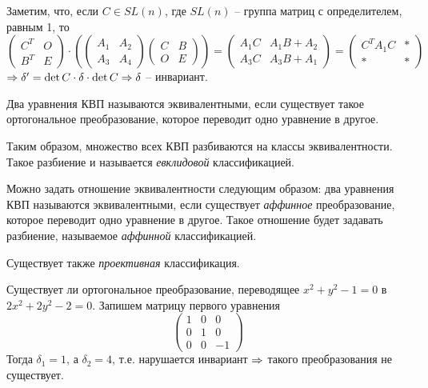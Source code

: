\begin{Rem}
	Заметим, что, если $C \in SL(n)$, где $SL(n)$ -- группа матриц с определителем, равным 1, то
	\[\left(\begin{array}{cc}
	C^T & O \\ 
	B^T & E
	\end{array}\right) \cdot \left(\left(\begin{array}{cc}
	A_1 & A_2 \\ 
	A_3 & A_4
	\end{array}\right) \left(\begin{array}{c|c}
	C & B \\ 
	\hline
	O & E
	\end{array}\right)\right) = \left(\begin{array}{cc}
	A_1 C & A_1 B + A_2 \\ 
	A_3 C & A_3 B + A_1
	\end{array}\right) = \left(\begin{array}{c|c}
	C^T A_1 C & * \\ 
	\hline
	* & *
	\end{array}\right)\]
	$\Rightarrow \delta' = \det C \cdot \delta \cdot \det C \Rightarrow \delta$ -- инвариант.
\end{Rem}


\begin{Def}
	Два уравнения КВП называются эквивалентными, если существует такое ортогональное преобразование, которое переводит одно уравнение в другое.
\end{Def}

\begin{Rem}
	Таким образом, множество всех КВП разбиваются на классы эквивалентности.
	Такое разбиение и называется \textit{евклидовой} классификацией.
\end{Rem}

\begin{Rem}
	Можно задать отношение эквивалентности следующим образом: два уравнения КВП называются эквивалентными, если существует \textit{аффинное} преобразование, которое переводит одно уравнение в другое.
	Такое отношение будет задавать разбиение, называемое \textit{аффинной} классификацией.
\end{Rem}

\begin{Rem}
	Существует также \textit{проективная} классификация.
\end{Rem}

\begin{Example}
	Существует ли ортогональное преобразование, переводящее $x^2 + y^2 - 1= 0$ в $2x^2 + 2y^2 -2 = 0$.
	Запишем матрицу первого уравнения
	\[\left(\begin{array}{ccc}
	1 & 0 & 0 \\ 
	0 & 1 & 0 \\ 
	0 & 0 & -1
	\end{array}\right)\]
	Тогда $\delta_1 = 1$, а $\delta_2 = 4$, т.е. нарушается инвариант $\Rightarrow$ такого преобразования не существует.  
\end{Example}

